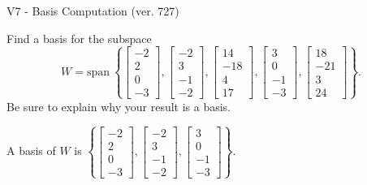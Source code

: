 \begin{exercise}
  \begin{exerciseTitle}V7 - Basis Computation (ver. 727)\end{exerciseTitle}
  \begin{exerciseStatement}
    Find a basis for the subspace 
\[W=\mathrm{span}\ \left\{\left[\begin{array}{r}
-2 \\
2 \\
0 \\
-3
\end{array}\right] , \left[\begin{array}{r}
-2 \\
3 \\
-1 \\
-2
\end{array}\right] , \left[\begin{array}{r}
14 \\
-18 \\
4 \\
17
\end{array}\right] , \left[\begin{array}{r}
3 \\
0 \\
-1 \\
-3
\end{array}\right] , \left[\begin{array}{r}
18 \\
-21 \\
3 \\
24
\end{array}\right]\right\}.\]
 Be sure to explain why your result is a basis.


  \end{exerciseStatement}
  \begin{exerciseAnswer}
   A basis of \(W\) is  \(\left\{\left[\begin{array}{r}
-2 \\
2 \\
0 \\
-3
\end{array}\right] , \left[\begin{array}{r}
-2 \\
3 \\
-1 \\
-2
\end{array}\right] , \left[\begin{array}{r}
3 \\
0 \\
-1 \\
-3
\end{array}\right]\right\}\).
  


  \end{exerciseAnswer}
\end{exercise}